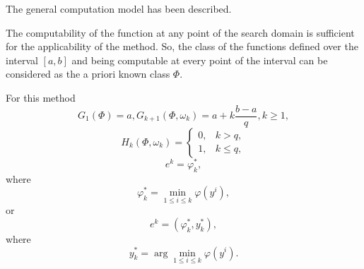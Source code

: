 The general computation model has been described. 


The computability of the function at any point of the search domain is sufficient for the applicability of the method. So, the class of the functions defined over the interval $[a,b]$ and being computable at every point of the interval can be considered as the a priori known class $\Phi$. 

For this method
\begin{displaymath}
G_1(\Phi)=a, G_{k+1}(\Phi,\omega_k)=a+k\frac{b-a}{q}, k\geq 1,
\end{displaymath}
\begin{displaymath}
  H_k(\Phi,\omega_k) =
  \begin{cases}
    0, & k > q, \\
    1, & k \leq q,
  \end{cases}
\end{displaymath}
\begin{equation}
\label{eq:1_18}
e^k=\varphi_k^*,
\end{equation}
where
\begin{equation}
\label{eq:1_19}
\varphi_k^*=\min_{1\leq i\leq k} \varphi(y^i),
\end{equation}
or
\begin{displaymath}
e^k=(\varphi_k^*,y_k^*),
\end{displaymath}
where 
\begin{displaymath}
y_k^*=\arg \min_{1\leq i\leq k} \varphi(y^i).
\end{displaymath}


